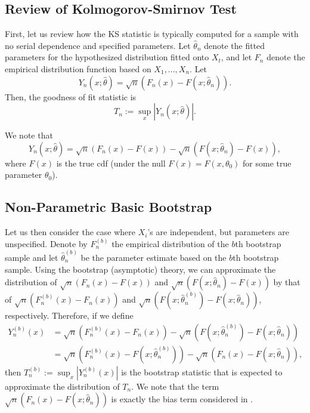 \documentclass[12pt, titlepage, letterpaper]{article}
\begin{document}
{\subsection{Review of Kolmogorov-Smirnov Test}

First, let us review how the KS statistic is typically computed for a sample
with no serial dependence and specified parameters.
Let $\hat\theta_n$ denote the fitted parameters for the hypothesized 
distribution fitted onto $X_t$, and let 
$F_n$ denote the empirical distribution function based on $X_1,...,X_n$.
Let
\begin{equation*}
Y_n(x; \hat\theta) = \sqrt{n}(F_n(x) - F(x; \hat\theta_n)).
\end{equation*}
Then, the
goodness of fit statistic is 
\begin{equation*}
T_n := \sup_x|Y_n(x; \hat\theta)|.
\end{equation*}

We note that
\begin{equation*}
Y_n(x; \hat\theta) = \sqrt{n}(F_n(x) - F(x)) - 
\sqrt{n}(F(x; \hat\theta_n) - F(x)),
\end{equation*}
where $F(x)$ is the true cdf (under the null $F(x) = F(x, \theta_0)$ for some
true parameter $\theta_0$).

\subsection{Non-Parametric Basic Bootstrap}

Let us then consider the case where $X_i$'s are independent, but parameters
are unspecified. Denote by
$F^{(b)}_n$ the empirical distribution of the $b$th bootstrap sample and let
$\hat\theta^{(b)}_n$ be the parameter estimate based on the $b$th bootstrap 
sample. 
Using the bootstrap (asymptotic) theory, we can approximate the distribution of
$\sqrt{n}(F_n(x) - F(x))$ and $\sqrt{n}(F(x; \hat\theta_n) - F(x))$
by that of $\sqrt{n}(F^{(b)}_n(x) - F_n(x))$ and
$\sqrt{n}(F(x; \hat\theta^{(b)}_n) - F(x; \hat\theta_n))$, respectively.
Therefore, if we define
\begin{align*}
Y^{(b)}_n(x) &= \sqrt{n}(F^{(b)}_n(x) - F_n(x)) - 
               \sqrt{n}(F(x; \hat\theta^{(b)}_n) - F(x; \hat\theta_n)) \\
             &= \sqrt{n}(F^{(b)}_n(x) - F(x; \hat\theta^{(b)}_n)) - 
               \sqrt{n}(F_n(x) - F(x; \hat\theta_n)),
\end{align*}
then $T^{(b)}_n := \sup_x|Y^{(b)}_n(x)|$ is the bootstrap statistic that is 
expected to approximate the distribution of $T_n$. We note that the term
$\sqrt{n}(F_n(x) - F(x; \hat\theta_n))$ is exactly the bias term considered in 
\citet{babu2004goodness}.

}
\end{document}
